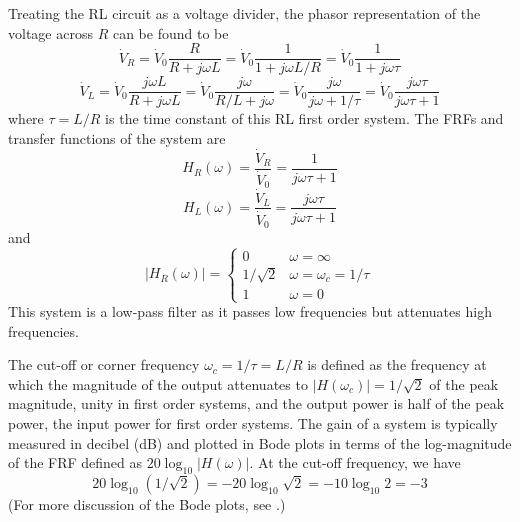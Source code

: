 \documentclass{article}
\begin{document}
\begin{itemize}
  Treating the RL circuit as a voltage divider, the phasor representation of
  the voltage across $R$ can be found to be
  \begin{equation}
    \dot{V}_R=\dot{V}_0\frac{R}{R+j\omega L}
    =\dot{V}_0\frac{1}{1+j\omega L/R}=\dot{V}_0\frac{1}{1+j\omega\tau}
  \end{equation}
  \begin{equation}
    \dot{V}_L=\dot{V}_0\frac{j\omega L}{R+j\omega L}
    =\dot{V}_0\frac{j\omega}{R/L+j\omega}=\dot{V}_0\frac{j\omega}{j\omega+1/\tau}
    =\dot{V}_0\frac{j\omega\tau}{j\omega\tau+1}
  \end{equation}
  where $\tau=L/R$ is the time constant of this RL first order system. The 
  FRFs and transfer functions of the system are
  \begin{equation} 
    H_R(\omega)=\frac{\dot{V}_R}{\dot{V}_0}=\frac{1}{j\omega\tau+1}
  \end{equation}
  \begin{equation}
    H_L(\omega)=\frac{\dot{V}_L}{\dot{V}_0}=\frac{j\omega\tau}{j\omega\tau+1}
  \end{equation}
  and
  \begin{equation}
    |H_R(\omega)|=\left\{\begin{array}{cl}0&\omega=\infty\\
    1/\sqrt{2}&\omega=\omega_c=1/\tau\\1&\omega=0\end{array}\right.
  \end{equation}
  This system is a low-pass filter as it passes low frequencies but 
  attenuates high frequencies. 

\end{itemize}

The cut-off or corner frequency $\omega_c=1/\tau=L/R$ is defined as
the frequency at which the magnitude of the output attenuates to 
$|H(\omega_c)|=1/\sqrt{2}$ of the peak magnitude, unity in first 
order systems, and the output power is half of the peak power, 
the input power for first order systems. The gain of a system is
typically measured in decibel (dB) and plotted in Bode plots in 
terms of the log-magnitude of the FRF defined as $ 20 \log_{10}|H(\omega)|$. 
At the cut-off frequency, we have
\begin{equation}
  20 \log_{10}(1/\sqrt{2})=-20\log_{10}\sqrt{2}=-10\log_{10}2=-3
\end{equation}
(For more discussion of the Bode plots, see
.)
\end{document}

